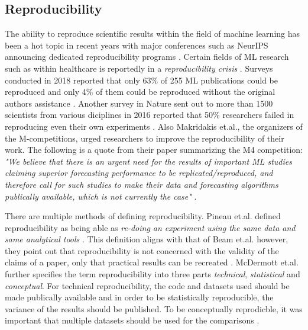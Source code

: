\subsection{Reproducibility}
\label{sec:reproducibility}
The ability to reproduce scientific results within the field of machine learning has been a hot topic in recent years with major conferences such as NeurIPS announcing dedicated reproducibility programs \cite{pineau2020improving}. Certain fields of ML research such as within healthcare is reportedly in a \textit{reproducibility crisis} \cite{beam2020challenges, mcdermott2019reproducibility}. Surveys conducted in 2018 reported that only 63\% of 255 ML publications could be reproduced and only 4\% of them could be reproduced without the original authors assistance \cite{pineau2020improving}. Another survey in Nature sent out to more than 1500 scientists from various diciplines in 2016 reported that 50\% researchers failed in reproducing even their own experiments \cite{baker20161}. Also Makridakis et.al., the organizers of the M-competitions, urged researchers to improve the reproducibility of their work. The following is a quote from their paper summarizing the M4 competition: \textit{"We believe that there is an urgent need for the results of important ML studies claiming superior forecasting performance to be replicated/reproduced, and therefore call for such studies to make their data and forecasting algorithms publically available, which is not currently the case"} \cite{makridakis_m4_2020}.

There are multiple methods of defining reproducibility. Pineau et.al. defined reproducibility as being able as \textit{re-doing an experiment using the same data and same analytical tools} \cite{pineau2020improving}. This definition aligns with that of Beam et.al. however, they point out that reproducibility is not concerned with the validity of the claims of a paper, only that practical results can be recreated \cite{beam2020challenges}. McDermott et.al. further specifies the term reproducibility into three parts \textit{technical}, \textit{statistical} and \textit{conceptual}. For technical reproducibility, the code and datasets used should be made publically available and in order to be statistically reproducible, the variance of the results should be published. To be conceptually reprodicble, it was important that multiple datasets should be used for the comparisons \cite{mcdermott2019reproducibility}.


